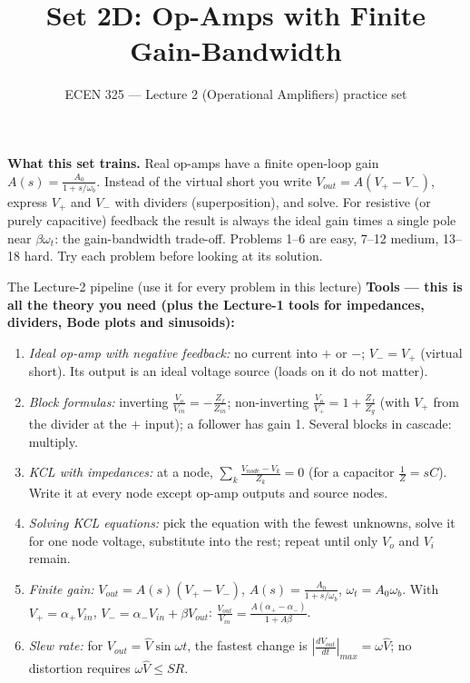 \documentclass[11pt]{article}
\title{Set 2D: Op-Amps with Finite Gain-Bandwidth}
\author{ECEN 325 --- Lecture 2 (Operational Amplifiers) practice set}
\date{}
\begin{document}
\maketitle

\textbf{What this set trains.} Real op-amps have a finite open-loop gain $A(s)=\frac{A_0}{1+s/\omega_b}$.
Instead of the virtual short you write $V_{out}=A(V_+-V_-)$, express $V_+$ and $V_-$ with dividers (superposition),
and solve. For resistive (or purely capacitive) feedback the result is always the ideal gain times a single pole
near $\beta\omega_t$: the gain-bandwidth trade-off. Problems 1--6 are easy, 7--12 medium, 13--18 hard. Try each
problem before looking at its solution.


\begin{cardbox}{The Lecture-2 pipeline (use it for every problem in this lecture)}
\textbf{Tools --- this is all the theory you need (plus the Lecture-1 tools for impedances, dividers, Bode plots
and sinusoids):}
\begin{enumerate}[label=\textbf{T\arabic*},leftmargin=2.2em,itemsep=1pt]
\item \emph{Ideal op-amp with negative feedback:} no current into $+$ or $-$; $V_-=V_+$ (virtual short).
      Its output is an ideal voltage source (loads on it do not matter).
\item \emph{Block formulas:} inverting $\frac{V_o}{V_{in}}=-\frac{Z_f}{Z_{in}}$; non-inverting
      $\frac{V_o}{V_+}=1+\frac{Z_f}{Z_g}$ (with $V_+$ from the divider at the $+$ input); a follower has gain 1.
      Several blocks in cascade: multiply.
\item \emph{KCL with impedances:} at a node, $\sum_k \frac{V_{node}-V_k}{Z_k}=0$ (for a capacitor
      $\frac{1}{Z}=sC$). Write it at every node except op-amp outputs and source nodes.
\item \emph{Solving KCL equations:} pick the equation with the fewest unknowns, solve it for one node voltage,
      substitute into the rest; repeat until only $V_o$ and $V_i$ remain.
\item \emph{Finite gain:} $V_{out}=A(s)(V_+-V_-)$, $A(s)=\frac{A_0}{1+s/\omega_b}$, $\omega_t=A_0\omega_b$.
      With $V_+=\alpha_+V_{in}$, $V_-=\alpha_-V_{in}+\beta V_{out}$: $\frac{V_{out}}{V_{in}}=\frac{A(\alpha_+-\alpha_-)}{1+A\beta}$.
\item \emph{Slew rate:} for $V_{out}=\hat V\sin\omega t$, the fastest change is $\left|\frac{dV_{out}}{dt}\right|_{max}=\omega\hat V$;
      no distortion requires $\omega\hat V\le SR$.
\end{enumerate}

\end{cardbox}
\end{document}
